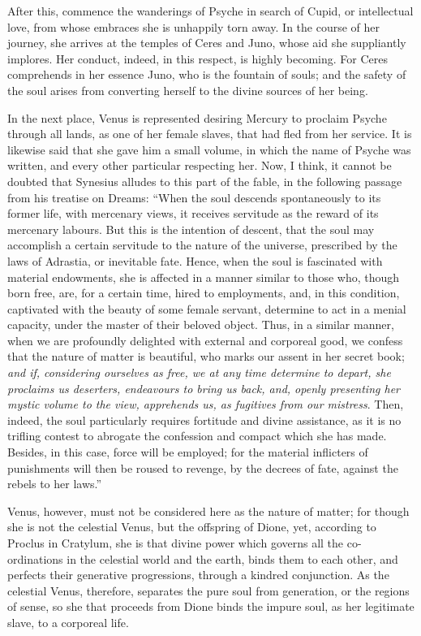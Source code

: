 \documentclass{article}
\begin{document}
{After this, commence the wanderings of Psyche in search of Cupid, or
intellectual love, from whose embraces she is unhappily torn away. In the
course of her journey, she arrives at the temples of Ceres and Juno, whose aid
she suppliantly implores. Her conduct, indeed, in this respect, is highly
becoming. For Ceres comprehends in her essence Juno, who is the fountain of
souls; and the safety of the soul arises from converting herself to the divine
sources of her being.

In the next place, Venus is represented desiring Mercury to proclaim Psyche
through all lands, as one of her female slaves, that had fled from her service.
It is likewise said that she gave him a small volume, in which the name of
Psyche was written, and every other particular respecting her. Now, I think, it
cannot be doubted that Synesius alludes to this part of the fable, in the
following passage from his treatise on Dreams: ``When the soul descends
spontaneously to its former life, with mercenary views, it receives servitude
as the reward of its mercenary labours. But this is the intention of descent,
that the soul may accomplish a certain servitude to the nature of the universe,
prescribed by the laws of Adrastia, or inevitable fate. Hence, when the soul is
fascinated with material endowments, she is affected in a manner similar to
those who, though born free, are, for a certain time, hired to employments,
and, in this condition, captivated with the beauty of some female servant,
determine to act in a menial capacity, under the master of their beloved
object. Thus, in a similar manner, when we are profoundly delighted with
external and corporeal good, we confess that the nature of matter is beautiful,
who marks our assent in her secret book; \textit{and if, considering ourselves
as free, we at any time determine to depart, she proclaims us deserters,
endeavours to bring us back, and, openly presenting her mystic volume to the
view, apprehends us, as fugitives from our mistress}. Then, indeed, the soul
particularly requires fortitude and divine assistance, as it is no trifling
contest to abrogate the confession and compact which she has made. Besides, in
this case, force will be employed; for the material inflicters of punishments
will then be roused to revenge, by the decrees of fate, against the rebels to
her laws.''

Venus, however, must not be considered here as the nature of matter; for though
she is not the celestial Venus, but the offspring of Dione, yet, according to
Proclus in Cratylum, she is that divine power which governs all the
co-ordinations in the celestial world and the earth, binds them to each other,
and perfects their generative progressions, through a kindred conjunction. As
the celestial Venus, therefore, separates the pure soul from generation, or the
regions of sense, so she that proceeds from Dione binds the impure soul, as her
legitimate slave, to a corporeal life.

}
\end{document}
